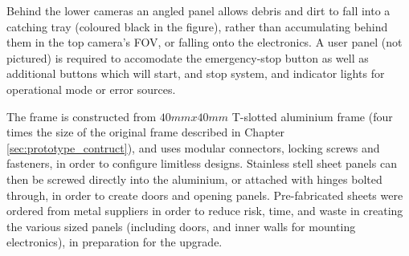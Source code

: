 \documentclass[fleqn,twoside]{article}
\begin{document}
Behind the lower cameras an angled panel allows debris and dirt to fall into a catching tray (coloured black in the figure), rather than accumulating behind them in the top camera's FOV, or falling onto the electronics. A user panel (not pictured) is required to accomodate the emergency-stop button as well as additional buttons which will start, and stop system, and indicator lights for operational mode or error sources.


The frame is constructed from $40mmx40mm$ T-slotted aluminium frame (four times the size of the original frame described in Chapter \ref{sec:prototype_contruct}), and uses modular connectors, locking screws and fasteners, in order to configure limitless designs. Stainless stell sheet panels can then be screwed directly into the aluminium, or attached with hinges bolted through, in order to create doors and opening panels. Pre-fabricated sheets were ordered from metal suppliers in order to reduce risk, time, and waste in creating the various sized panels (including doors, and inner walls for mounting electronics), in preparation for the upgrade.
\end{document}
